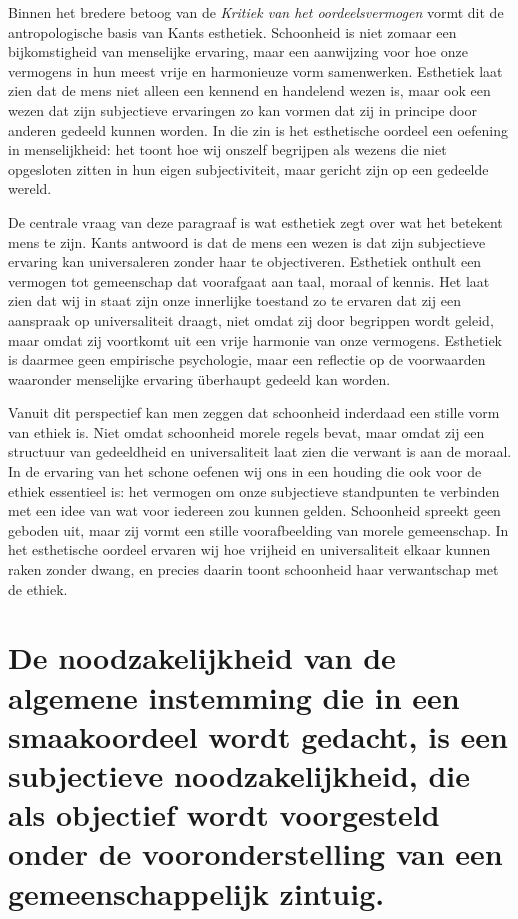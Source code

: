 \begin{mdframed}[leftmargin=0pt,rightmargin=0pt,backgroundcolor=blue!6,linecolor=white,innertopmargin=6pt,innerbottommargin=6pt]
Binnen het bredere betoog van de \emph{Kritiek van het oordeelsvermogen} vormt dit de antropologische basis van Kants esthetiek. Schoonheid is niet zomaar een bijkomstigheid van menselijke ervaring, maar een aanwijzing voor hoe onze vermogens in hun meest vrije en harmonieuze vorm samenwerken. Esthetiek laat zien dat de mens niet alleen een kennend en handelend wezen is, maar ook een wezen dat zijn subjectieve ervaringen zo kan vormen dat zij in principe door anderen gedeeld kunnen worden. In die zin is het esthetische oordeel een oefening in menselijkheid: het toont hoe wij onszelf begrijpen als wezens die niet opgesloten zitten in hun eigen subjectiviteit, maar gericht zijn op een gedeelde wereld.

De centrale vraag van deze paragraaf is wat esthetiek zegt over wat het betekent mens te zijn. Kants antwoord is dat de mens een wezen is dat zijn subjectieve ervaring kan universaleren zonder haar te objectiveren. Esthetiek onthult een vermogen tot gemeenschap dat voorafgaat aan taal, moraal of kennis. Het laat zien dat wij in staat zijn onze innerlijke toestand zo te ervaren dat zij een aanspraak op universaliteit draagt, niet omdat zij door begrippen wordt geleid, maar omdat zij voortkomt uit een vrije harmonie van onze vermogens. Esthetiek is daarmee geen empirische psychologie, maar een reflectie op de voorwaarden waaronder menselijke ervaring überhaupt gedeeld kan worden.

Vanuit dit perspectief kan men zeggen dat schoonheid inderdaad een stille vorm van ethiek is. Niet omdat schoonheid morele regels bevat, maar omdat zij een structuur van gedeeldheid en universaliteit laat zien die verwant is aan de moraal. In de ervaring van het schone oefenen wij ons in een houding die ook voor de ethiek essentieel is: het vermogen om onze subjectieve standpunten te verbinden met een idee van wat voor iedereen zou kunnen gelden. Schoonheid spreekt geen geboden uit, maar zij vormt een stille voorafbeelding van morele gemeenschap. In het esthetische oordeel ervaren wij hoe vrijheid en universaliteit elkaar kunnen raken zonder dwang, en precies daarin toont schoonheid haar verwantschap met de ethiek.
\end{mdframed}

\section{De noodzakelijkheid van de algemene instemming die in een smaakoordeel wordt gedacht, is een subjectieve noodzakelijkheid, die als objectief wordt voorgesteld onder de vooronderstelling van een gemeenschappelijk zintuig.}

